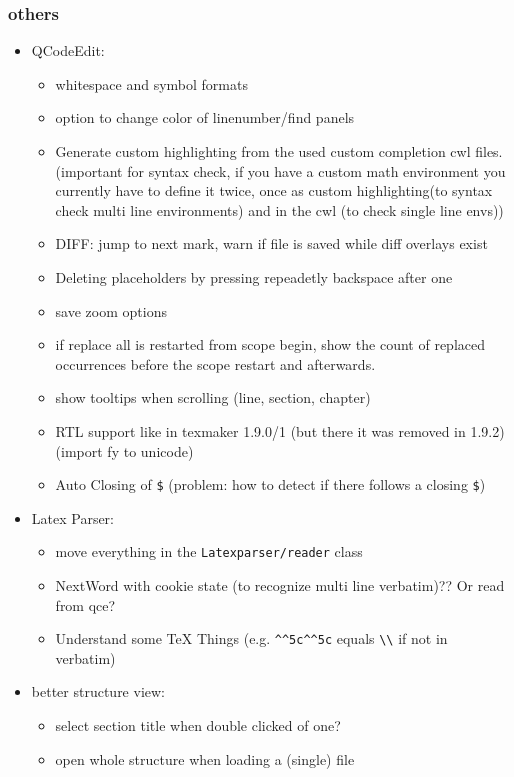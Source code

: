 \documentclass[10pt,a4paper,landscape]{report}
\begin{document}
\subsubsection{others}
\begin{itemize}
	\item QCodeEdit: \begin{itemize}
		\item whitespace and symbol formats
		\item option to change color of linenumber/find panels
		\item Generate custom highlighting from the used custom completion cwl files. (important for syntax check, if you have a custom math environment you currently have to define it twice, once as custom highlighting(to syntax check multi line environments) and in the cwl (to check single line envs))
		\item DIFF: jump to next mark, warn if file is saved while diff overlays exist
		\item Deleting placeholders by pressing repeadetly backspace after one
		\item save zoom options
		\item if replace all is restarted from scope begin, show the count of replaced occurrences before the scope restart and afterwards.
		\item show tooltips when scrolling (line, section, chapter)
		\item RTL support like in texmaker 1.9.0/1 (but there it was removed in 1.9.2) (import fy to unicode)
		\item Auto Closing of \verb+$+ (problem: how to detect if there follows a closing \verb+$+)
	\end{itemize}
	\item Latex Parser: \begin{itemize}
		\item move everything in the \verb+Latexparser/reader+ class
		\item NextWord with cookie state (to recognize multi line verbatim)?? Or read from qce?
		\item Understand some TeX Things (e.g. \verb+^^5c^^5c+ equals \verb+\\+ if not in verbatim)
	\end{itemize}
	\item better structure view: \begin{itemize}
		\item select section title when double clicked of one?	
		\item open whole structure when loading a (single)	 file

\end{itemize}
\end{itemize}
\end{document}
